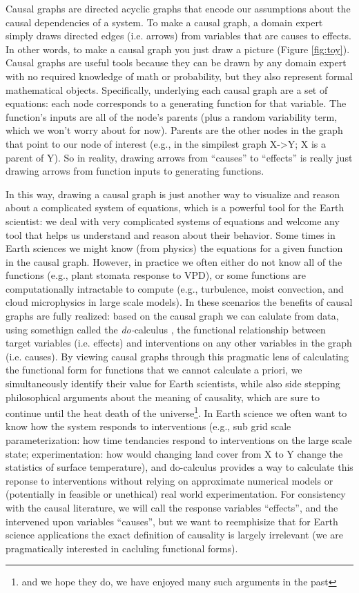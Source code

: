 \documentclass[12pt]{article}
\begin{document}
Causal graphs are directed acyclic graphs that encode our assumptions
about the causal dependencies of a system.  To make a causal graph, a
domain expert simply draws directed edges (i.e. arrows) from variables
that are causes to effects. In other words, to make a causal graph you
just draw a picture (Figure \ref{fig:toy}). Causal graphs are useful
tools because they can be drawn by any domain expert with no required
knowledge of math or probability, but they also represent formal
mathematical objects. Specifically, underlying each causal graph are a
set of equations: each node corresponds to a generating function for
that variable. The function's inputs are all of the node's parents
(plus a random variability term, which we won't worry about for
now). Parents are the other nodes in the graph that point to our node
of interest (e.g., in the simpilest graph X->Y; X is a parent of
Y). So in reality, drawing arrows from ``causes'' to ``effects'' is
really just drawing arrows from function inputs to generating
functions.

In this way, drawing a causal graph is just another way to visualize
and reason about a complicated system of equations, which is a
powerful tool for the Earth scientist: we deal with very complicated
systems of equations and welcome any tool that helps us understand and
reason about their behavior. Some times in Earth sciences we might
know (from physics) the equations for a given function in the causal
graph. However, in practice we often either do not know all of the
functions (e.g., plant stomata response to VPD), or some functions are
computationally intractable to compute (e.g., turbulence, moist
convection, and cloud microphysics in large scale models). In these
scenarios the benefits of causal graphs are fully realized: based on
the causal graph we can calulate from data, using somethign called the
\textit{do-}calculus \citep{pearl-1994-do-calculus}, the functional
relationship between target variables (i.e. effects) and interventions
on any other variables in the graph (i.e. causes). By viewing causal
graphs through this pragmatic lens of calculating the functional form
for functions that we cannot calculate a priori, we simultaneously
identify their value for Earth scientists, while also side stepping
philosophical arguments about the meaning of causality, which are sure
to continue until the heat death of the universe\footnote{and we hope
  they do, we have enjoyed many such arguments in the past}. In Earth
science we often want to know how the system responds to interventions
(e.g., sub grid scale parameterization: how time tendancies respond to
interventions on the large scale state; experimentation: how would
changing land cover from X to Y change the statistics of surface
temperature), and do-calculus provides a way to calculate this reponse
to interventions without relying on approximate numerical models or
(potentially in feasible or unethical) real world experimentation. For
consistency with the causal literature, we will call the response
variables ``effects'', and the intervened upon variables ``causes'',
but we want to reemphisize that for Earth science applications the
exact definition of causality is largely irrelevant (we are
pragmatically interested in cacluling functional forms).
\end{document}

